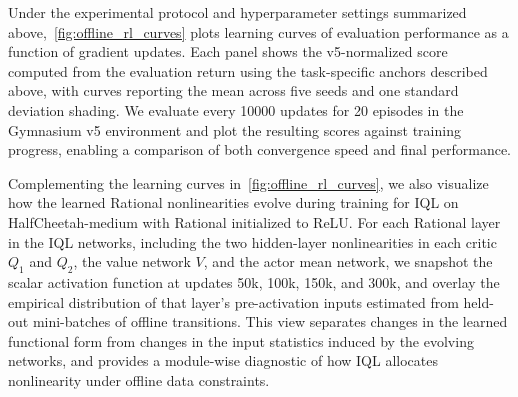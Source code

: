 \documentclass{article}
\theoremstyle{plain}
\theoremstyle{definition}
\theoremstyle{remark}
\begin{document}
\newpage
Under the experimental protocol and hyperparameter settings summarized above,~\cref{fig:offline_rl_curves} plots learning curves of evaluation performance as a function of gradient updates. Each panel shows the v5-normalized score computed from the evaluation return using the task-specific anchors described above, with curves reporting the mean across five seeds and one standard deviation shading. We evaluate every \num{10000} updates for 20 episodes in the Gymnasium v5 environment and plot the resulting scores against training progress, enabling a comparison of both convergence speed and final performance.

Complementing the learning curves in~\cref{fig:offline_rl_curves}, we also visualize how the learned Rational nonlinearities evolve during training for IQL on HalfCheetah-medium with Rational initialized to ReLU. For each Rational layer in the IQL networks, including the two hidden-layer nonlinearities in each critic $Q_1$ and $Q_2$, the value network $V$, and the actor mean network, we snapshot the scalar activation function at updates 50k, 100k, 150k, and 300k, and overlay the empirical distribution of that layer's pre-activation inputs estimated from held-out mini-batches of offline transitions. This view separates changes in the learned functional form from changes in the input statistics induced by the evolving networks, and provides a module-wise diagnostic of how IQL allocates nonlinearity under offline data constraints.
\end{document}
